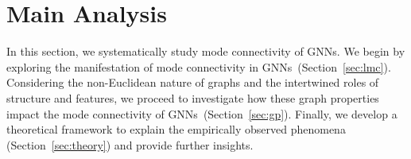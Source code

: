 \section{Main Analysis}
\label{sec: main}

In this section, we systematically study mode connectivity of GNNs. We begin by exploring the manifestation of mode connectivity in GNNs~(Section~\ref{sec:lmc}). Considering the non-Euclidean nature of graphs and the intertwined roles of structure and features, we proceed to investigate how these graph properties impact the mode connectivity of GNNs~(Section~\ref{sec:gp}). Finally, we develop a theoretical framework to explain the empirically observed phenomena (Section~\ref{sec:theory}) and provide further insights.  






